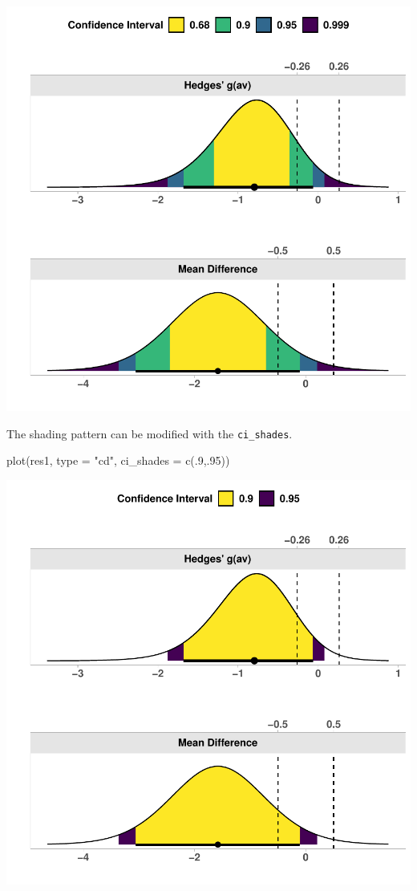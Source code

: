 \documentclass[]{interact}
\theoremstyle{plain}%
\theoremstyle{definition}
\theoremstyle{remark}
\newenvironment{Shaded}{\begin{snugshade}}{\end{snugshade}}
\newcommand{\AttributeTok}[1]{\textcolor[rgb]{0.77,0.63,0.00}{#1}}
\newcommand{\DecValTok}[1]{\textcolor[rgb]{0.00,0.00,0.81}{#1}}
\newcommand{\FunctionTok}[1]{\textcolor[rgb]{0.00,0.00,0.00}{#1}}
\newcommand{\NormalTok}[1]{#1}
\newcommand{\StringTok}[1]{\textcolor[rgb]{0.31,0.60,0.02}{#1}}
\begin{document}
\includegraphics{Avocado_Update_files/figure-latex/unnamed-chunk-5-1.pdf}

The shading pattern can be modified with the \texttt{ci\_shades}.

\begin{Shaded}
\begin{Highlighting}[]
\FunctionTok{plot}\NormalTok{(res1, }\AttributeTok{type =} \StringTok{"cd"}\NormalTok{,}
     \AttributeTok{ci\_shades =} \FunctionTok{c}\NormalTok{(.}\DecValTok{9}\NormalTok{,.}\DecValTok{95}\NormalTok{))}
\end{Highlighting}
\end{Shaded}

\includegraphics{Avocado_Update_files/figure-latex/unnamed-chunk-6-1.pdf}
\end{document}
